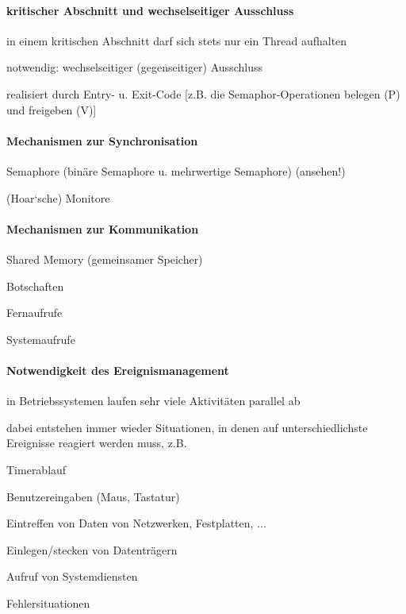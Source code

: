 \documentclass[a4pape]{article}
\begin{document}
\begin{multicols}{3}
  \paragraph{kritischer Abschnitt und wechselseitiger Ausschluss}
  \begin{itemize*}
    \item in einem kritischen Abschnitt darf sich stets nur ein Thread aufhalten
    \item notwendig: wechselseitiger (gegenseitiger) Ausschluss
    \item realisiert durch Entry- u. Exit-Code [z.B. die Semaphor-Operationen belegen (P) und freigeben (V)]
  \end{itemize*}

  \paragraph{Mechanismen zur Synchronisation}
  \begin{itemize*}
    \item Semaphore (binäre Semaphore u. mehrwertige Semaphore) (ansehen!)
    \item (Hoar‘sche) Monitore
  \end{itemize*}

  \paragraph{Mechanismen zur Kommunikation}
  \begin{itemize*}
    \item Shared Memory (gemeinsamer Speicher)
    \item Botschaften
    \item Fernaufrufe
    \item Systemaufrufe
  \end{itemize*}

  \paragraph{Notwendigkeit des Ereignismanagement}
  \begin{itemize*}
    \item in Betriebssystemen laufen sehr viele Aktivitäten parallel ab
    \item dabei entstehen immer wieder Situationen, in denen auf unterschiedlichste Ereignisse reagiert werden muss, z.B.
    \begin{itemize*}
      \item Timerablauf
      \item Benutzereingaben (Maus, Tastatur)
      \item Eintreffen von Daten von Netzwerken, Festplatten, ...
      \item Einlegen/stecken von Datenträgern
      \item Aufruf von Systemdiensten
      \item Fehlersituationen
    \end{itemize*}
  \end{itemize*}


\end{multicols}
\end{document}
